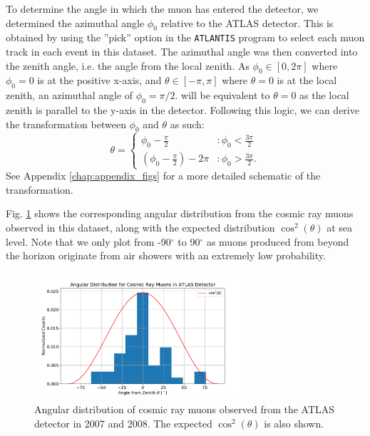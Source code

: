 \documentclass[a4paper]{report}
\numberwithin{equation}{section}
\begin{document}
To determine the angle in which the muon has entered the detector, we determined the azimuthal angle $\phi_0$ relative to the ATLAS detector. 
This is obtained by using the ''pick'' option in the \texttt{ATLANTIS} program to select each muon track in each event in this dataset. The azimuthal 
angle was then converted into the zenith angle, i.e. the angle from the local zenith. As $\phi_0 \in [0, 2\pi]$ where $\phi_0=0$ 
is at the positive x-axis, and $\theta \in [-\pi, \pi]$ where $\theta = 0$ is at the local zenith, an azimuthal angle of $\phi_0 = \pi / 2.$
will be equivalent to $\theta = 0$ as the local zenith is parallel to the y-axis in the detector. Following this logic, we can derive
the transformation between $\phi_0$ and $\theta$ as such: 
\begin{equation}
	\theta = 
	\begin{cases}
		\phi_0 - \frac{\pi}{2}   & : \phi_0 < \frac{3\pi}{2}\\
		(\phi_0 - \frac{\pi}{2}) - 2\pi & : \phi_0 > \frac{3\pi}{2}.
	\end{cases}
\end{equation}
See Appendix \ref{chap:appendix_figs} for a more detailed schematic of the transformation. \par 

Fig. \ref{fig:muon_angdist} shows the corresponding angular distribution from the cosmic ray muons observed in this dataset, along with the expected 
distribution $\cos^2 (\theta)$ at sea level. Note that we only plot from -90$^\circ$ to 90$^\circ$ as muons produced from beyond the horizon 
originate from air showers with an extremely low probability.\par 
\begin{figure}[htpb]
    \centering
    \includegraphics[width=0.7\textwidth]{muon_angdist.pdf}
    \caption{Angular distribution of cosmic ray muons observed from the ATLAS detector in 2007 and 2008. The expected $\cos^2 (\theta)$
	is also shown.}
    \label{fig:muon_angdist}
\end{figure}
\end{document}
